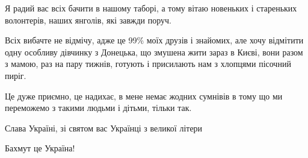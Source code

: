 Я радий вас всіх бачити в нашому таборі, а тому вітаю новеньких і стареньких
волонтерів, наших янголів, які завжди поруч.

Всіх вибачте не відмічу, адже це 99\% моїх друзів і знайомих, але хочу
відмітити одну особливу дівчинку з Донецька, що змушена жити зараз в Києві,
вони разом з мамою, раз на пару тижнів, готують і присилають нам з хлопцями
пісочний пиріг. 

Це дуже приємно, це надихає, в мене немає жодних сумнівів в тому що ми
переможемо з такими людьми і дітьми, тільки так.

Слава Україні, зі святом вас Українці з великої літери🤝

Бахмут це Україна!
